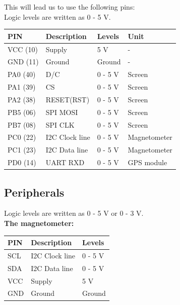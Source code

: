 This will lead us to use the following pins:\\
Logic levels are written as 0 - 5 V.\\

\begin{table}[H]
\centering
    \begin{tabular}{|l|l|l|l|}
    \hline
    PIN 		& Description    & Levels 	& Unit  \\ \hline
    VCC (10) 	& Supply         & 5 V    	& -		\\ \hline
    GND (11) 	& Ground         & Ground  	& -		\\ \hline
    PA0 (40)	& D/C			 & 0 - 5 V	& Screen \\ \hline
    PA1 (39)	& CS			 & 0 - 5 V  & Screen \\ \hline
    PA2 (38)	& RESET(RST)	 & 0 - 5 V  & Screen \\ \hline
    PB5	(06)	& SPI MOSI		 & 0 - 5 V  & Screen \\ \hline
    PB7 (08)	& SPI CLK		 & 0 - 5 V  & Screen \\ \hline
    PC0 (22) 	& I2C Clock line & 0 - 5 V 	& Magnetometer 	\\ \hline
    PC1 (23) 	& I2C Data line  & 0 - 5 V 	& Magnetometer		\\ \hline
    PD0 (14)	& UART RXD		 & 0 - 5 V	& GPS module \\ \hline
    \end{tabular}
\end{table}

\subsection{Peripherals}
Logic levels are written as 0 - 5 V or 0 - 3 V.\\

\textbf{The magnetometer:}\\
\begin{table}[H]
\centering
    \begin{tabular}{|l|l|l|}
    \hline
    PIN & Description    & Levels  \\ \hline
    SCL & I2C Clock line & 0 - 5 V \\ \hline
    SDA & I2C Data line  & 0 - 5 V \\ \hline
    VCC & Supply         & 5 V     \\ \hline
    GND & Ground         & Ground  \\ \hline
    \end{tabular}
\end{table}

